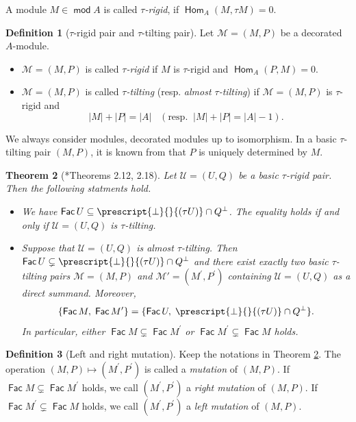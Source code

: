 \documentclass[10pt]{amsart}
\newtheorem{theorem}{Theorem}[section]
\theoremstyle{definition}
\newtheorem{definition}[theorem]{Definition}
\theoremstyle{remark}
\numberwithin{equation}{section}
\def\mod{\opname{mod}\nolimits}
\newcommand{\opname}[1]{\operatorname{\mathsf{#1}}}
\newcommand{\Fac}{\opname{Fac}}
\newcommand{\Hom}{\opname{Hom}}
\begin{document}
A module $M\in\mod A$ is called {\em $\tau$-rigid}, if $\Hom_A(M,\tau M)=0$.





\begin{definition}[$\tau$-rigid pair and $\tau$-tilting pair]
Let $\mathcal M=(M,P)$ be a decorated $A$-module.
\begin{itemize}

\item[(i)]  $\mathcal M=(M,P)$ is called \emph{$\tau$-rigid} if $M$ is $\tau$-rigid and $\Hom_A(P,M)=0$. 
\item[(ii)]  $\mathcal M=(M,P)$ is called \emph{$\tau$-tilting} (resp. {\em almost $\tau$-tilting}) if $\mathcal M=(M,P)$ is $\tau$-rigid and  \[|M|+|P|=|A|\;\;\; (\text{resp.}\;\;  |M|+|P|=|A|-1).\]
\end{itemize}
\end{definition}
We always consider modules, decorated modules up to isomorphism. In a basic $\tau$-tilting pair $(M,P)$, it is known from \cite[Proposition 2.3]{air_2014} that $P$ is uniquely determined by $M$.

\begin{theorem}[\cite{air_2014}*{Theorems 2.12, 2.18}] \label{thm-air-mutation}
Let $\mathcal U=(U,Q)$ be a basic $\tau$-rigid pair. Then the following statments hold.
\begin{itemize}
    \item [(i)] We have $\Fac U\subseteq  \prescript{\bot}{}{(\tau U)}\cap Q^\bot$. The equality holds if and only if $\mathcal U=(U,Q)$ is $\tau$-tilting.
    \item[(ii)] Suppose that $\mathcal U=(U,Q)$ is almost $\tau$-tilting. Then $\Fac U\subsetneq \prescript{\bot}{}{(\tau U)}\cap Q^\bot$ and
there exist exactly two basic
$\tau$-tilting pairs $\mathcal M=(M,P)$ and $\mathcal M'=(M^\prime,P^\prime)$ containing $\mathcal U=(U,Q)$ as a direct summand. Moreover,
$$\{\Fac M,\;\Fac M^\prime\}=\{\Fac U,\;\prescript{\bot}{}{(\tau U)}\cap Q^\bot\}.$$
In particular, either $\Fac M\subsetneq \Fac M^\prime$ or
$\Fac M^\prime\subsetneq\Fac M$ holds.
\end{itemize}
\end{theorem}

\begin{definition}[Left and right mutation]
Keep the notations in Theorem \ref{thm-air-mutation}. The operation $(M,P)\mapsto(M^\prime,P^\prime)$ is called a \emph{mutation} of $(M,P)$. If $\Fac M\subsetneq \Fac M^\prime$ holds, we call $(M^\prime, P^\prime)$ a {\em right mutation} of $(M,P)$. If $\Fac M^\prime \subsetneq \Fac M$ holds, we call $(M^\prime, P^\prime)$ a {\em left mutation} of $(M,P)$.
\end{definition}
\end{document}
